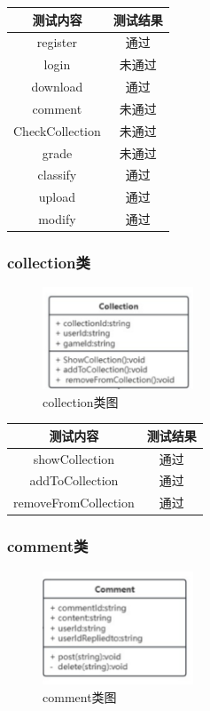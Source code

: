 \documentclass[12pt]{ctexart} %
\begin{document}
  \begin{table}[H]
  \centering  %
  \begin{tabular}{|c|c|}
    \hline
    测试内容 & 测试结果 \\
    \hline
    register& 通过 \\
    \hline
    login& 未通过 \\
    \hline
    download& 通过 \\
    \hline
    comment& 未通过 \\
    \hline
    CheckCollection& 未通过 \\
    \hline
    grade& 未通过 \\
    \hline
    classify& 通过 \\
    \hline
    upload& 通过 \\
    \hline
    modify& 通过 \\
    \hline
  \end{tabular}
\end{table}

\subsubsection{collection类}
\begin{figure}[H]
  \centering
  \includegraphics[width=0.4\textwidth]{collection.png}
  \caption{collection类图} %
\end{figure}
  \begin{table}[H]
  \centering  %
  \begin{tabular}{|c|c|}
    \hline
    测试内容 & 测试结果 \\
    \hline
    showCollection& 通过 \\
    \hline
    addToCollection& 通过 \\
    \hline
    removeFromCollection& 通过 \\
    \hline
  \end{tabular}
\end{table}

\subsubsection{comment类}
\begin{figure}[H]
  \centering
  \includegraphics[width=0.4\textwidth]{comment.png}
  \caption{comment类图} %
\end{figure}
\end{document}

